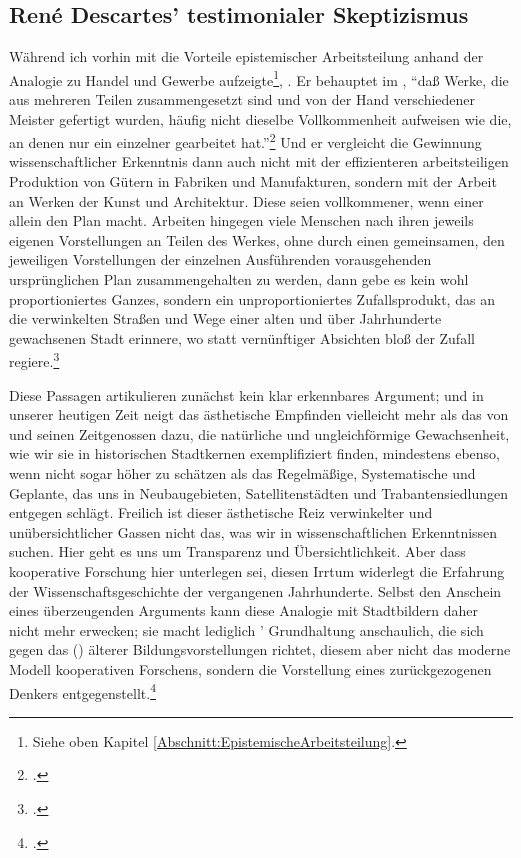 \subsection{Ren{\'e} Descartes' testimonialer
Skeptizismus}\label{subsection:DescartesKritikantestimonialemWissen}
Während ich vorhin mit  die Vorteile epistemischer Arbeitsteilung
anhand der Analogie zu Handel und Gewerbe aufzeigte\footnote{Siehe oben Kapitel
\ref{Abschnitt:EpistemischeArbeitsteilung}.},
 
.
Er behauptet im , \enquote{daß Werke, die aus
mehreren Teilen zusammengesetzt sind und von der Hand verschiedener Meister
gefertigt wurden, häufig nicht dieselbe Vollkommenheit aufweisen wie die, an
denen nur ein einzelner gearbeitet hat.}\footnote{\cite[][VI:
11]{Descartes:OeuvresdeDescartes1983}.} Und er vergleicht die Gewinnung
wissenschaftlicher Erkenntnis dann auch nicht mit der effizienteren
arbeitsteiligen Produktion von Gütern in Fabriken und Manufakturen, sondern mit
der Arbeit an Werken der Kunst und Architektur. Diese seien vollkommener, wenn
einer allein den Plan macht. Arbeiten hingegen viele Menschen nach ihren jeweils
eigenen Vorstellungen an Teilen des Werkes, ohne durch einen gemeinsamen, den
jeweiligen Vorstellungen der einzelnen Ausführenden vorausgehenden
ursprünglichen Plan zusammengehalten zu werden, dann gebe es kein
wohl proportioniertes Ganzes, sondern ein unproportioniertes Zufallsprodukt, das
an die verwinkelten Straßen und Wege einer alten und über Jahrhunderte
gewachsenen Stadt erinnere, wo statt vernünftiger Absichten bloß der Zufall
regiere.\footnote{\cite[Vgl.][VI: 11--13]{Descartes:OeuvresdeDescartes1983}.}

Diese Passagen artikulieren zunächst kein klar erkennbares Argument; und in
unserer heutigen Zeit neigt das ästhetische Empfinden vielleicht mehr als das von
 und seinen Zeitgenossen dazu, die natürliche und
ungleichförmige Gewachsenheit, wie wir sie in historischen Stadtkernen
exemplifiziert finden, mindestens ebenso, wenn nicht sogar höher zu schätzen als
das Regelmäßige, Systematische und Geplante, das uns in Neubaugebieten,
Satellitenstädten und Trabantensiedlungen entgegen schlägt. Freilich ist dieser
ästhetische Reiz verwinkelter und unübersichtlicher Gassen nicht das, was wir in
wissenschaftlichen Erkenntnissen suchen. Hier geht es uns um
Transparenz und Übersichtlichkeit. Aber dass kooperative Forschung hier
unterlegen sei, diesen Irrtum widerlegt die Erfahrung der
Wissenschaftsgeschichte der vergangenen Jahrhunderte. Selbst den Anschein eines
überzeugenden Arguments kann diese Analogie mit Stadtbildern daher nicht mehr
erwecken; sie macht lediglich ' Grundhaltung anschaulich, die
sich gegen das 
() älterer Bildungsvorstellungen richtet,
diesem aber nicht das moderne Modell kooperativen Forschens, sondern die
Vorstellung eines zurückgezogenen Denkers
entgegenstellt.\footnote{\cite[Vgl.][VI: 9]{Descartes:OeuvresdeDescartes1983}.}

